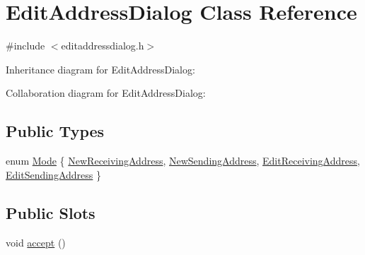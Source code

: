 \hypertarget{class_edit_address_dialog}{}\section{Edit\+Address\+Dialog Class Reference}
\label{class_edit_address_dialog}


{\ttfamily \#include $<$editaddressdialog.\+h$>$}



Inheritance diagram for Edit\+Address\+Dialog\+:


Collaboration diagram for Edit\+Address\+Dialog\+:
\subsection*{Public Types}
\begin{DoxyCompactItemize}
\item 
enum \hyperlink{class_edit_address_dialog_a456fdd27ee1c150824241ded7bb4de3a}{Mode} \{ \hyperlink{class_edit_address_dialog_a456fdd27ee1c150824241ded7bb4de3aa449a42099e353016ccdfbe714f7d2fda}{New\+Receiving\+Address}, 
\hyperlink{class_edit_address_dialog_a456fdd27ee1c150824241ded7bb4de3aa3b6348db9c19ac481a3cde94ac9cf65c}{New\+Sending\+Address}, 
\hyperlink{class_edit_address_dialog_a456fdd27ee1c150824241ded7bb4de3aa9fb7cde7f74d41aa4439d6c1a8b53507}{Edit\+Receiving\+Address}, 
\hyperlink{class_edit_address_dialog_a456fdd27ee1c150824241ded7bb4de3aa16a8a82d7d10059eb7c03952438aa193}{Edit\+Sending\+Address}
 \}
\end{DoxyCompactItemize}
\subsection*{Public Slots}
\begin{DoxyCompactItemize}
\item 
void \hyperlink{class_edit_address_dialog_ac52b71129806bccf6533d0e9441393b6}{accept} ()
\end{DoxyCompactItemize}
